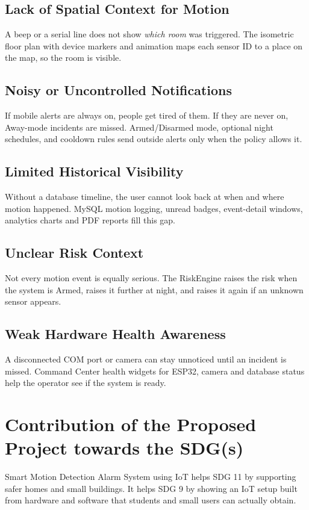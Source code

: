 \documentclass[12pt,a4paper]{report}
\begin{document}
\subsection{Lack of Spatial Context for Motion}
A beep or a serial line does not show \emph{which room} was triggered. The isometric floor plan with device markers and animation maps each sensor ID to a place on the map, so the room is visible.

\subsection{Noisy or Uncontrolled Notifications}
If mobile alerts are always on, people get tired of them. If they are never on, Away-mode incidents are missed. Armed/Disarmed mode, optional night schedules, and cooldown rules send outside alerts only when the policy allows it.

\subsection{Limited Historical Visibility}
Without a database timeline, the user cannot look back at when and where motion happened. MySQL motion logging, unread badges, event-detail windows, analytics charts and PDF reports fill this gap.

\subsection{Unclear Risk Context}
Not every motion event is equally serious. The RiskEngine raises the risk when the system is Armed, raises it further at night, and raises it again if an unknown sensor appears.

\subsection{Weak Hardware Health Awareness}
A disconnected COM port or camera can stay unnoticed until an incident is missed. Command Center health widgets for ESP32, camera and database status help the operator see if the system is ready.

\section{Contribution of the Proposed Project towards the SDG(s)}

Smart Motion Detection Alarm System using IoT helps SDG 11 by supporting safer homes and small buildings. It helps SDG 9 by showing an IoT setup built from hardware and software that students and small users can actually obtain.
\end{document}
